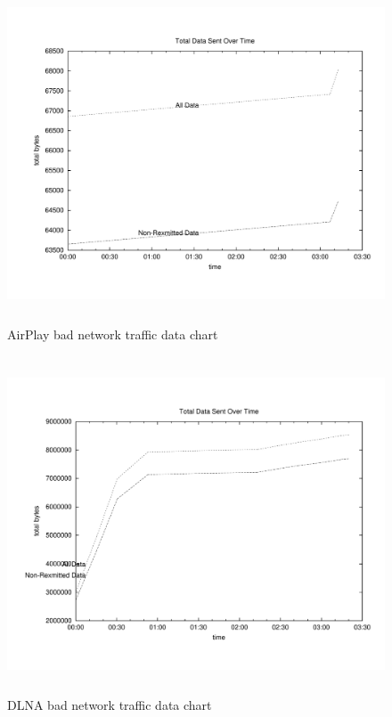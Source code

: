 \begin{figure}[htb]
\centering \includegraphics[height=10cm]{charts/AirPlay_traffic_10loss_data}
\caption{AirPlay bad network traffic data chart \label{chart6}}
\end{figure}
\begin{figure}[htb]
\centering \includegraphics[height=10cm]{charts/dlna_traffic_10loss_data}
\caption{DLNA bad network traffic data chart \label{chart6}}
\end{figure}


